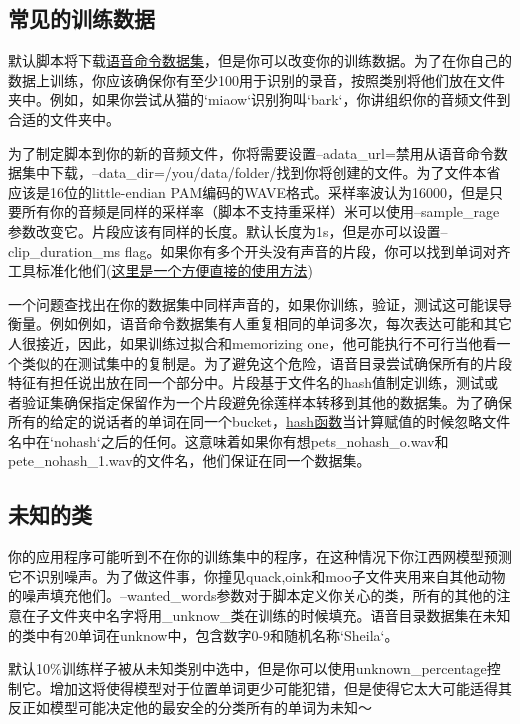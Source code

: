 {\subsection{常见的训练数据}
默认脚本将下载\href{https://download.tensorflow.org/data/speech_commands_v0.01.tgz}{语音命令数据集}，但是你可以改变你的训练数据。为了在你自己的数据上训练，你应该确保你有至少100用于识别的录音，按照类别将他们放在文件夹中。例如，如果你尝试从猫的`miaow`识别狗叫`bark`，你讲组织你的音频文件到合适的文件夹中。

为了制定脚本到你的新的音频文件，你将需要设置--adata\_url=禁用从语音命令数据集中下载，--data\_dir=/you/data/folder/找到你将创建的文件。为了文件本省应该是16位的little-endian PAM编码的WAVE格式。采样率波认为16000，但是只要所有你的音频是同样的采样率（脚本不支持重采样）米可以使用--sample\_rage参数改变它。片段应该有同样的长度。默认长度为1s，但是亦可以设置--clip\_duration\_ms flag。如果你有多个开头没有声音的片段，你可以找到单词对齐工具标准化他们(\href{https://petewarden.com/2017/07/17/a-quick-hack-to-align-single-word-audio-recordings/}{这里是一个方便直接的使用方法})

一个问题查找出在你的数据集中同样声音的，如果你训练，验证，测试这可能误导衡量。例如例如，语音命令数据集有人重复相同的单词多次，每次表达可能和其它人很接近，因此，如果训练过拟合和memorizing one，他可能执行不可行当他看一个类似的在测试集中的复制是。为了避免这个危险，语音目录尝试确保所有的片段特征有担任说出放在同一个部分中。片段基于文件名的hash值制定训练，测试或者验证集确保指定保留作为一个片段避免徐莲样本转移到其他的数据集。为了确保所有的给定的说话者的单词在同一个bucket，\href{https://github.com/tensorflow/tensorflow/tree/master/tensorflow/examples/speech_commands/input_data.py}{hash函数}当计算赋值的时候忽略文件名中在`nohash`之后的任何。这意味着如果你有想pets\_nohash\_o.wav和pete\_nohash\_1.wav的文件名，他们保证在同一个数据集。
\subsection{未知的类}
你的应用程序可能听到不在你的训练集中的程序，在这种情况下你江西网模型预测它不识别噪声。为了做这件事，你撞见quack,oink和moo子文件夹用来自其他动物的噪声填充他们。--wanted\_words参数对于脚本定义你关心的类，所有的其他的注意在子文件夹中名字将用\_unknow\_类在训练的时候填充。语音目录数据集在未知的类中有20单词在unknow中，包含数字0-9和随机名称`Sheila`。

默认10\%训练样子被从未知类别中选中，但是你可以使用unknown\_percentage控制它。增加这将使得模型对于位置单词更少可能犯错，但是使得它太大可能适得其反正如模型可能决定他的最安全的分类所有的单词为未知～
}
